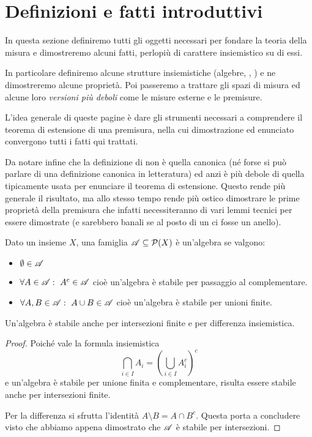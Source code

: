 \section{Definizioni e fatti introduttivi}
In questa sezione definiremo tutti gli oggetti necessari per fondare la teoria della misura e dimostreremo alcuni fatti, perlopiù di carattere insiemistico su di essi.

In particolare definiremo alcune strutture insiemistiche (algebre, \sigalg[e], \semiring[i]) e ne dimostreremo alcune proprietà. Poi passeremo a trattare gli spazi di misura ed alcune loro \emph{versioni più deboli} come le misure esterne e le premisure.

L'idea generale di queste pagine è dare gli strumenti necessari a comprendere il teorema di estensione di una premisura, nella cui dimostrazione ed enunciato convergono tutti i fatti qui trattati. 

Da notare infine che la definizione di \semiring{} non è quella canonica (né forse si può parlare di una definizione canonica in letteratura) ed anzi è più debole di quella tipicamente usata per enunciare il teorema di estensione. Questo rende più generale il risultato, ma allo stesso tempo rende più ostico dimostrare le prime proprietà della premisura che infatti necessiteranno di vari lemmi tecnici per essere dimostrate (e sarebbero banali se al posto di un \semiring{} ci fosse un anello).

\begin{definition}[Algebra]
	Dato un insieme $X$, una famiglia $\mathscr A\subseteq\mathcal P(X)$ è un'algebra se valgono:
	\begin{itemize}
		\item $\emptyset\in\mathscr A$
		\item $\forall A\in\mathscr A:\ A^c\in\mathscr A$ cioè un'algebra è stabile per passaggio al complementare.
		\item $\forall A,B\in\mathscr A:\ A\cup B\in\mathscr A$ cioè un'algebra è stabile per unioni finite.
	\end{itemize}
\end{definition}
\begin{remark}\label{nota:ProprietaAlg}
	Un'algebra è stabile anche per intersezioni finite e per differenza insiemistica.
\end{remark}
\begin{proof}
	Poiché vale la formula insiemistica
	\begin{equation*}
		\bigcap_{i\in I} A_i = \left( \bigcup_{i\in I} A_i^c \right)^c
	\end{equation*}
	e un'algebra è stabile per unione finita e complementare, risulta essere stabile anche per intersezioni finite.
	
	Per la differenza si sfrutta l'identità $A\setminus B=A\cap B^c$. Questa porta a concludere visto che abbiamo appena dimostrato che $\mathscr A$ è stabile per intersezioni.
\end{proof}


